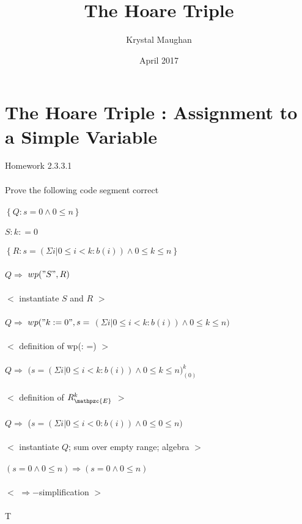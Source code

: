 \documentclass{article}
\title{The Hoare Triple}
\author{Krystal Maughan }
\date{April 2017}
\begin{document}
\maketitle

\section{The Hoare Triple : Assignment to a Simple Variable}
Homework 2.3.3.1
\\
\\
Prove the following code segment correct
\\
\\
$\left\{Q : s = 0 \land 0 \leq n \right\}$ 
\\
\\
$ S : k: = 0$
\\
\\
$\left\{R : s = (\Sigma i | 0 \leq i < k : b(i)) \land 0 \leq k \leq n \right\}$
\\
\\
$Q \Rightarrow $ $wp("S", R)$
\\
\\
$<$ instantiate $S$ and $R$ $>$
\\
\\
$Q \Rightarrow$ $wp("k := 0", s = $ $(\Sigma i | 0 \leq i < k : b(i)) \land 0 \leq k \leq n)$
\\
\\
$<$ definition of wp(: =) $>$
\\
\\
$Q \Rightarrow$ $( s = {(\Sigma i | 0 \leq i < k : b(i)) \land 0 \leq  k \leq n)}_{(0)}^{k}$
\\
\\
$<$ definition of ${R}_{\mathpzc{E}}^{k}$ $>$
\\
\\
$Q \Rightarrow $ ($s = (\Sigma i | 0 \leq i < 0 : b(i)) \land 0 \leq 0 \leq n)$
\\
\\
$<$ instantiate $Q$; sum over empty range; algebra $>$
\\
\\
$(s = 0 \land 0 \leq n) \Rightarrow (s = 0 \land 0 \leq n)$
\\
\\
$<$ $\Rightarrow -$simplification $>$
\\
\\
T
\end{document}
